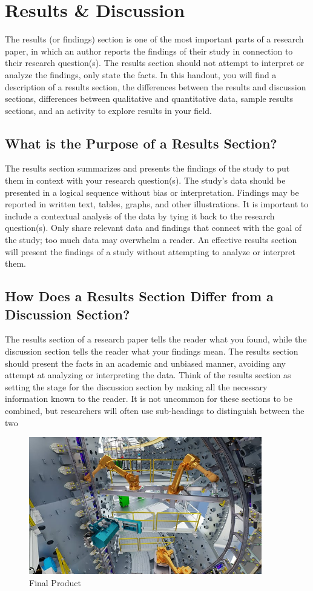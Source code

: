 
\chapter{Results \& Discussion}
The results (or findings) section is one of the most important parts of a research paper, in which an author reports the findings of their study in connection to their research question(s). The results section should not attempt to interpret or analyze the findings, only state the facts. In this handout, you will find a description of a results section, the differences between the results and discussion sections, differences between qualitative and quantitative data, sample results sections, and an activity to explore results in your field.  
\section{What is the Purpose of a Results Section?} 
The results section summarizes and presents the findings of the study to put them in context with your research question(s). The study’s data should be presented in a logical sequence without bias or interpretation. Findings may be reported in written text, tables, graphs, and other illustrations. It is important to include a contextual analysis of the data by tying it back to the research question(s). Only share relevant data and findings that connect with the goal of the study; too much data may overwhelm a reader. An effective results section will present the findings of a study without attempting to analyze or interpret them.
\section{How Does a Results Section Differ from a Discussion Section?}  

The results section of a research paper tells the reader what you found, while the discussion section tells the reader what your findings mean. The results section should present the facts in an academic and unbiased manner, avoiding any attempt at analyzing or interpreting the data. Think of the results section as setting the stage for the discussion section by making all the necessary information known to the reader. It is not uncommon for these sections to be combined, but researchers will often use sub-headings to distinguish between the two

\begin{figure}[ht]
	\centering
	\includegraphics[width=4in]{figures/result_engg.jpg}
	\caption{Final Product\label{fig:over2}}
\end{figure}